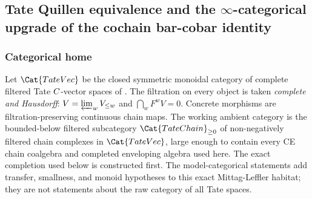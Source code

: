 %
%
%
%

\subsection[Tate Quillen equivalence and the infinity-categorical upgrade]{Tate Quillen equivalence and the $\infty$-categorical
upgrade of the cochain bar-cobar identity}\label{sec:tate-quillen}

\subsubsection{Categorical home}

Let $\Cat{TateVec}$ be the closed symmetric monoidal category of
complete filtered Tate $C$-vector spaces of \alpharef. The
filtration on every object is taken \emph{complete and Hausdorff}:
$V=\varprojlim_w V_{\leq w}$ and $\bigcap_w F^w V=0$. Concrete
morphisms are filtration-preserving continuous chain maps. The
working ambient category is the bounded-below filtered subcategory
$\Cat{TateChain}_{\geq 0}$ of non-negatively filtered chain
complexes in $\Cat{TateVec}$, large enough to contain every CE
  chain coalgebra and completed enveloping algebra used here.  The
  exact completion used below is constructed first.  The
  model-categorical statements add transfer, smallness, and monoid
  hypotheses to this exact Mittag-Leffler habitat; they are not
  statements about the raw category of all Tate spaces.

